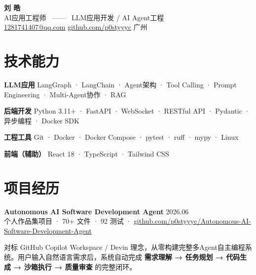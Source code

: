 \documentclass[11pt,a4paper]{article}
\begin{document}
\begin{center}
  {\Huge\bfseries\color{text} 刘 皓} \\[4pt]
  {\large\color{accent} AI应用工程师 \ —— \ LLM应用开发 / AI Agent工程} \\[8pt]
  {\small\color{textsecondary}
    \href{mailto:1281741407@qq.com}{1281741407@qq.com} \quad
    \href{https://github.com/p0styyyc}{github.com/p0styyyc} \quad
    广州
  }
\end{center}

\vspace{4pt}

\section{技术能力}

\newcommand{\skilltag}[1]{\colorbox{tagbg}{\textcolor{tagtext}{\texttt{\small #1}}}}

{\small
\textbf{LLM应用} \quad LangGraph · LangChain · Agent架构 · Tool Calling · Prompt Engineering · Multi-Agent协作 · RAG

\textbf{后端开发} \quad Python 3.11+ · FastAPI · WebSocket · RESTful API · Pydantic · 异步编程 · Docker SDK

\textbf{工程工具} \quad Git · Docker · Docker Compose · pytest · ruff · mypy · Linux

\textbf{前端（辅助）} \quad React 18 · TypeScript · Tailwind CSS
}

\section{项目经历}

\noindent
{\large\bfseries Autonomous AI Software Development Agent} \hfill {\small\color{textsecondary}2026.06} \\
{\small\color{textsecondary} 个人作品集项目 · 70+ 文件 · 92 测试 · \href{https://github.com/p0styyyc/Autonomous-AI-Software-Development-Agent}{github.com/p0styyyc/Autonomous-AI-Software-Development-Agent}}

\vspace{4pt}

{\small 对标 GitHub Copilot Workspace / Devin 理念，从零构建完整多Agent自主编程系统。用户输入自然语言需求后，系统自动完成 \textbf{需求理解 → 任务规划 → 代码生成 → 沙箱执行 → 质量审查} 的完整闭环。}

\vspace{4pt}
\end{document}
